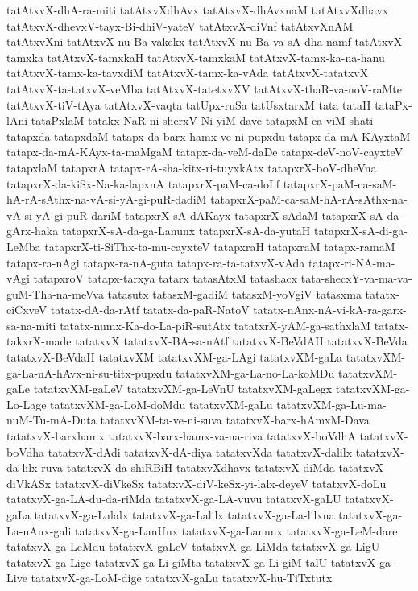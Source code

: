 {tatAtxvX-dhA-ra-miti
tatAtxvXdhAvx
tatAtxvX-dhAvxnaM
tatAtxvXdhavx
tatAtxvX-dhevxV-tayx-Bi-dhiV-yateV
tatAtxvX-diVnf
tatAtxvXnAM
tatAtxvXni
tatAtxvX-nu-Ba-vakekx
tatAtxvX-nu-Ba-va-sA-dha-namf
tatAtxvX-tamxka
tatAtxvX-tamxkaH
tatAtxvX-tamxkaM
tatAtxvX-tamx-ka-na-hanu
tatAtxvX-tamx-ka-tavxdiM
tatAtxvX-tamx-ka-vAda
tatAtxvX-tatatxvX
tatAtxvX-ta-tatxvX-veMba
tatAtxvX-tatetxvXV
tatAtxvX-thaR-va-noV-raMte
tatAtxvX-tiV-tAya
tatAtxvX-vaqta
tatUpx-ruSa
tatUsxtarxM
tata
tataH
tataPx-lAni
tataPxlaM
tatakx-NaR-ni-sherxV-Ni-yiM-dave
tatapxM-ca-viM-shati
tatapxda
tatapxdaM
tatapx-da-barx-hamx-ve-ni-pupxdu
tatapx-da-mA-KAyxtaM
tatapx-da-mA-KAyx-ta-maMgaM
tatapx-da-veM-daDe
tatapx-deV-noV-cayxteV
tatapxlaM
tatapxrA
tatapx-rA-sha-kitx-ri-tuyxkAtx
tatapxrX-boV-dheVna
tatapxrX-da-kiSx-Na-ka-lapxnA
tatapxrX-paM-ca-doLf
tatapxrX-paM-ca-saM-hA-rA-sAthx-na-vA-si-yA-gi-puR-dadiM
tatapxrX-paM-ca-saM-hA-rA-sAthx-na-vA-si-yA-gi-puR-dariM
tatapxrX-sA-dAKayx
tatapxrX-sAdaM
tatapxrX-sA-da-gArx-haka
tatapxrX-sA-da-ga-Lanunx
tatapxrX-sA-da-yutaH
tatapxrX-sA-di-ga-LeMba
tatapxrX-ti-SiThx-ta-mu-cayxteV
tatapxraH
tatapxraM
tatapx-ramaM
tatapx-ra-nAgi
tatapx-ra-nA-guta
tatapx-ra-ta-tatxvX-vAda
tatapx-ri-NA-ma-vAgi
tatapxroV
tatapx-tarxya
tatarx
tatasAtxM
tatashacx
tata-shecxY-va-ma-va-guM-Tha-na-meVva
tatasutx
tatasxM-gadiM
tatasxM-yoVgiV
tatasxma
tatatx-ciCxveV
tatatx-dA-da-rAtf
tatatx-da-paR-NatoV
tatatx-nAnx-nA-vi-kA-ra-garx-sa-na-miti
tatatx-numx-Ka-do-La-piR-sutAtx
tatatxrX-yAM-ga-sathxlaM
tatatx-takxrX-made
tatatxvX
tatatxvX-BA-sa-nAtf
tatatxvX-BeVdAH
tatatxvX-BeVda
tatatxvX-BeVdaH
tatatxvXM
tatatxvXM-ga-LAgi
tatatxvXM-gaLa
tatatxvXM-ga-La-nA-hAvx-ni-su-titx-pupxdu
tatatxvXM-ga-La-no-La-koMDu
tatatxvXM-gaLe
tatatxvXM-gaLeV
tatatxvXM-ga-LeVnU
tatatxvXM-gaLegx
tatatxvXM-ga-Lo-Lage
tatatxvXM-ga-LoM-doMdu
tatatxvXM-gaLu
tatatxvXM-ga-Lu-ma-nuM-Tu-mA-Duta
tatatxvXM-ta-ve-ni-suva
tatatxvX-barx-hAmxM-Dava
tatatxvX-barxhamx
tatatxvX-barx-hamx-va-na-riva
tatatxvX-boVdhA
tatatxvX-boVdha
tatatxvX-dAdi
tatatxvX-dA-diya
tatatxvXda
tatatxvX-dalilx
tatatxvX-da-lilx-ruva
tatatxvX-da-shiRBiH
tatatxvXdhavx
tatatxvX-diMda
tatatxvX-diVkASx
tatatxvX-diVkeSx
tatatxvX-diV-keSx-yi-lalx-deyeV
tatatxvX-doLu
tatatxvX-ga-LA-du-da-riMda
tatatxvX-ga-LA-vuvu
tatatxvX-gaLU
tatatxvX-gaLa
tatatxvX-ga-Lalalx
tatatxvX-ga-Lalilx
tatatxvX-ga-La-lilxna
tatatxvX-ga-La-nAnx-gali
tatatxvX-ga-LanUnx
tatatxvX-ga-Lanunx
tatatxvX-ga-LeM-dare
tatatxvX-ga-LeMdu
tatatxvX-gaLeV
tatatxvX-ga-LiMda
tatatxvX-ga-LigU
tatatxvX-ga-Lige
tatatxvX-ga-Li-giMta
tatatxvX-ga-Li-giM-talU
tatatxvX-ga-Live
tatatxvX-ga-LoM-dige
tatatxvX-gaLu
tatatxvX-hu-TiTxtutx
}
